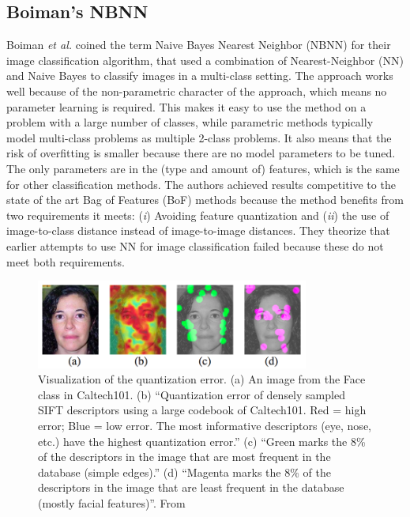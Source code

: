 \subsection{Boiman's NBNN} %
\label{sub:boiman_s_nbnn}
Boiman \emph{et al.} \cite{boiman2008defense} coined the term Naive Bayes Nearest Neighbor (NBNN) for their image classification algorithm, that used a combination of Nearest-Neighbor (NN) and Naive Bayes to classify images in a multi-class setting. The approach works well because of the non-parametric character of the approach, which means no parameter learning is required. This makes it easy to use the method on a problem with a large number of classes, while parametric methods typically model multi-class problems as multiple 2-class problems. It also means that the risk of overfitting is smaller because there are no model parameters to be tuned. The only parameters are in the (type and amount of) features, which is the same for other classification methods. The authors achieved results competitive to the state of the art Bag of Features (BoF) methods because the method benefits from two requirements it meets: (\emph{i}) Avoiding feature quantization and (\emph{ii}) the use of image-to-class distance instead of image-to-image distances. They theorize that earlier attempts to use NN \cite{berg2005shape, zhang2006svm} for image classification failed because these do not meet both requirements.

\begin{figure}[hbt]
    \centering
    \includegraphics[width=0.8\textwidth]{QuantizationError}
    \caption{Visualization of the quantization error. (a) An image from the Face class in Caltech101. \cite{caltech101} (b) ``Quantization error of densely sampled SIFT descriptors using a large codebook of Caltech101. Red = high error; Blue = low error. The most informative descriptors (eye, nose, etc.) have the highest quantization error.'' (c) ``Green marks the 8\% of the descriptors in the image that are most frequent in the database (simple edges).'' (d) ``Magenta marks the 8\% of the descriptors in the image that are least frequent in the database (mostly facial features)''. From \cite{boiman2008defense}}
    \label{fig:quantization_error}
\end{figure}

